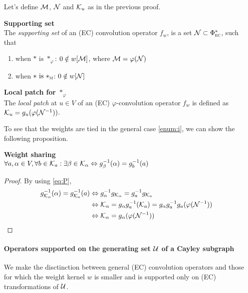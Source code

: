 Let's define $\mathcal{M}$, $\mathcal{N}$ and $\mathcal{K}_u$ as in the previous proof.
\begin{definition}\textbf{Supporting set}\\
The \emph{supporting set} of an (EC) convolution operator $f_w$, is a set $\mathcal{N} \subset \Phi^*_{\operatorname{\textsc{ec}}}$, such that
\begin{enumerate}[label=(\roman*)]
  \item when $\ast \text{ is } \ast_\varphi$: $0 \notin w[\mathcal{M}]$, where $\mathcal{M}= \varphi(\mathcal{N})$ \label{enum:i}
  \item when $\ast \text{ is } \ast_{\operatorname{\textsc{m}}}$: $0 \notin w[\mathcal{N}]$ \label{enum:ii}
\end{enumerate}
\end{definition}

\begin{definition}\textbf{Local patch for $\ast_\varphi$}\\
The \emph{local patch} at $u \in V$ of an (EC) $\varphi$-convolution operator $f_w$ is defined as $\mathcal{K}_u = g_u(\varphi(\mathcal{N}^{-1}))$.
\end{definition}

To see that the weights are tied in the general case \ref{enum:i}, we can show the following proposition.

\begin{proposition}\textbf{Weight sharing}\\
$\forall a, \alpha \in V, \forall b \in \mathcal{K}_a: \exists \beta \in \mathcal{K}_{\alpha} \Leftrightarrow g_{\beta}^{-1}(\alpha) = g_{b}^{-1}(a)$
\end{proposition}
\begin{proof}
By using \eqref{eq:P},
\begin{align*}
g_{\mathcal{K}_\alpha}^{-1}(\alpha) = g_{\mathcal{K}_a}^{-1}(a)
	& \Leftrightarrow  g_{\alpha}^{-1}g_{\mathcal{K}_{\alpha}} = g_a^{-1}g_{\mathcal{K}_a}\\
	& \Leftrightarrow  \mathcal{K}_{\alpha} = g_{\alpha}g_a^{-1}(\mathcal{K}_a) = g_{\alpha}g_a^{-1}g_a(\varphi(\mathcal{N}^{-1}))\\
	& \Leftrightarrow  \mathcal{K}_{\alpha} = g_{\alpha}(\varphi(\mathcal{N}^{-1}))
\end{align*}
\end{proof}

\paragraph{Operators supported on the generating set $\mathcal{U}$ of a Cayley subgraph}

We make the disctinction between general (EC) convolution operators and those for which the weight kernel $w$ is smaller and is supported only on (EC) transformations of $\mathcal{U}$.

